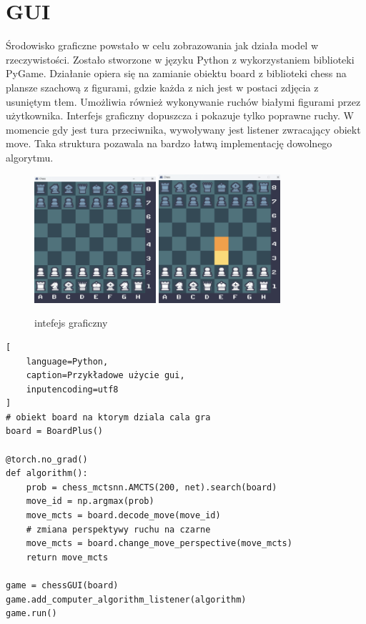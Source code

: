 \section*{GUI}

Środowisko graficzne powstało w celu zobrazowania jak działa model w rzeczywistości. Zostało stworzone w języku Python z wykorzystaniem biblioteki PyGame. Działanie opiera się na zamianie obiektu board z biblioteki chess na plansze szachową z figurami, gdzie każda z nich jest w postaci zdjęcia z usuniętym tłem. Umożliwia również wykonywanie ruchów białymi figurami przez użytkownika. Interfejs graficzny dopuszcza i pokazuje tylko poprawne ruchy. W momencie gdy jest tura przeciwnika, wywoływany jest listener zwracający obiekt move. Taka struktura pozawala na bardzo łatwą implementację dowolnego algorytmu.

\begin{figure}[h]
\centering
\includegraphics[width=0.4\textwidth]{images/gui_czyste.png}
\hspace{1cm}
\includegraphics[width=0.4\textwidth]{images/gui_ruch.png}
\caption{intefejs graficzny}
\end{figure}

\lstset{style=codeListingStyle}
\begin{lstlisting}[
    language=Python, 
    caption=Przykładowe użycie gui,
    inputencoding=utf8
]
# obiekt board na ktorym dziala cala gra
board = BoardPlus() 

@torch.no_grad()
def algorithm():
    prob = chess_mctsnn.AMCTS(200, net).search(board)
    move_id = np.argmax(prob)
    move_mcts = board.decode_move(move_id)
    # zmiana perspektywy ruchu na czarne
    move_mcts = board.change_move_perspective(move_mcts)
    return move_mcts

game = chessGUI(board)
game.add_computer_algorithm_listener(algorithm)
game.run()
\end{lstlisting}